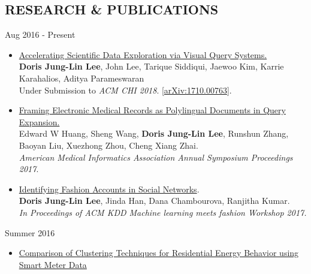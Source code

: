 \documentclass{res}
\begin{document}
\begin{resume}
\section{\large{RESEARCH \& PUBLICATIONS}}
\vspace{5pt}
\hspace{-10pt}{\normalsize\bf Graduate Student Research Assistant at UIUC} \hspace{145pt} Aug 2016 - Present
\begin{itemize}[leftmargin=0.3em]
  \item \href{https://arxiv.org/abs/1710.00763}{Accelerating Scientific Data Exploration via Visual Query Systems.}
    \\ {\footnotesize\textbf{Doris Jung-Lin Lee}, John Lee, Tarique Siddiqui, Jaewoo Kim, Karrie Karahalios, Aditya Parameswaran
    \vspace{-5pt}
    \\ Under Submission to \textit{ACM CHI 2018}. [\href{https://arxiv.org/abs/1710.00763}{arXiv:1710.00763}]}.  
  \item \href{https://amia2017.zerista.com/event/member/389402}{Framing Electronic Medical Records as Polylingual Documents in Query Expansion.} 
    \\ {\footnotesize Edward W Huang, Sheng Wang, \textbf{Doris Jung-Lin Lee}, Runshun Zhang, Baoyan Liu, Xuezhong Zhou, Cheng Xiang Zhai.
    \vspace{-5pt}
    \\ \textit{American Medical Informatics Association Annual Symposium Proceedings 2017}}.
  \item \href{https://kddfashion2017.mybluemix.net/final_submissions/ML4Fashion_paper_21.pdf}{Identifying Fashion Accounts in Social Networks}.  
    \\ {\footnotesize \textbf{Doris Jung-Lin Lee}, Jinda Han, Dana Chambourova, Ranjitha Kumar.
    \vspace{-5pt}
    \\ \textit{In Proceedings of ACM KDD Machine learning meets fashion Workshop 2017.}}
\end{itemize}
\vspace{-5pt}     
\hspace{-10pt}{\normalsize\bf Lawrence Berkeley National Lab Scientific Data Management Group} \hspace{58pt} Summer 2016
   \begin{itemize}[leftmargin=0.3em]
    \item \href{https://sdm.lbl.gov/perf/AISGSB2017-final2.pdf}{Comparison of Clustering Techniques for Residential Energy Behavior using Smart Meter Data}

\end{itemize}
\end{resume}
\end{document}
